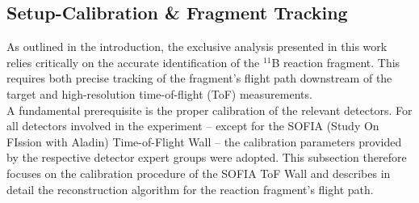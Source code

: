 \subsection{Setup-Calibration \& Fragment Tracking}
As outlined in the introduction, the exclusive analysis presented in this work relies critically on the accurate identification of the $^{11}$B reaction fragment. This requires both precise tracking of the fragment's flight path downstream of the target and high-resolution time-of-flight (ToF) measurements.\\
A fundamental prerequisite is the proper calibration of the relevant detectors. For all detectors involved in the experiment -- except for the SOFIA (Study On FIssion with Aladin) Time-of-Flight Wall -- the calibration parameters provided by the respective detector expert groups were adopted.
This subsection therefore focuses on the calibration procedure of the SOFIA ToF Wall and describes in detail the reconstruction algorithm for the reaction fragment's flight path.

